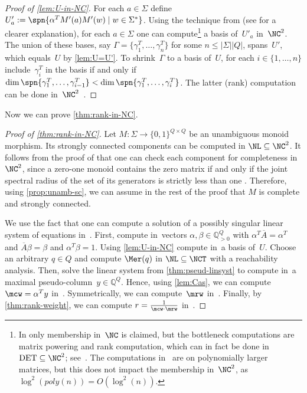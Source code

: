 \begin{proof}[Proof of \autoref{lem:U-in-NC}]
For each $a \in \Sigma$ define $U'_a := \spn{\alpha^T M'(a) M'(w) \mid w \in \Sigma^*}$.
Using the technique from \cite[Section 4.2]{KieferMW14} (see \cite[Proposition 5.2]{KieferWeighted20} for a clearer explanation), for each $a \in \Sigma$ one can compute\footnote{In \cite{KieferMW14,KieferWeighted20} only membership in~$\NC$ is claimed, but the bottleneck computations are matrix powering and rank computation, which can in fact be done in $\mathrm{DET} \subseteq \NC^2$; see~\cite{Cook85}.
The computations in~\cite[Proposition 5.2]{KieferWeighted20} are on polynomially larger matrices, but this does not impact the membership in~$\NC^2$, as $\log^2(\mathit{poly}(n)) = O(\log^2(n))$.} a basis of~$U'_a$ in~$\NC^2$.
The union of these bases, say $\Gamma = \{\gamma_1^T, \ldots, \gamma_n^T\}$ for some $n \le |\Sigma| |Q|$, spans~$U'$, which equals~$U$ by \autoref{lem:U=U'}.
To shrink~$\Gamma$ to a basis of~$U$, for each $i \in \{1, \ldots, n\}$ include~$\gamma_i^T$ in the basis if and only if $\dim \spn{\gamma_1^T, \ldots, \gamma_{i-1}^T} < \dim \spn{\gamma_1^T, \ldots, \gamma_i^T}$.
The latter (rank) computation can be done in~$\NC^2$~\cite{IbarraMoranRosier80}. %
\end{proof}

\noindent
Now we can prove \autoref{thm:rank-in-NC}.
\begin{proof}[Proof of \autoref{thm:rank-in-NC}]
Let $M : \Sigma \to \{0,1\}^{Q \times Q}$ be an unambiguous monoid morphism.
Its strongly connected components can be computed in $\NL \subseteq \NC^2$.
It follows from the proof of \cite[Proposition 3]{Kiefer2021} that one can check each component for completeness in~$\NC^2$, since a zero-one monoid contains the zero matrix if and only if the joint spectral radius of the set of its generators is strictly less than one \cite{Kiefer2021}.
Therefore, using \autoref{prop:unamb-sc}, we can assume in the rest of the proof that $M$ is complete and strongly connected.

We use the fact that one can compute a solution of a possibly singular linear system of equations in~\NCT \cite[Section~5]{BorodinGH82}.
First, compute in~\NCT vectors $\alpha, \beta \in \mathbb{Q}_{>0}^Q$ with $\alpha^T \overline{A} = \alpha^T$ and $\overline{A} \beta = \beta$ and $\alpha^T \beta = 1$.
Using \autoref{lem:U-in-NC} compute in~\NCT a basis of~$U$.
Choose an arbitrary $q \in Q$ and compute $\Mer(q)$ in $\NL \subseteq \NCT$ with a reachability analysis.
Then, solve the linear system from \autoref{thm:pseud-linsyst} to compute in~\NCT a maximal pseudo-column~$y \in \mathbb{Q}^Q$.
Hence, using \autoref{lem:Cas}, we can compute~$\mcw = \alpha^T y$ in~\NCT.
Symmetrically, we can compute~$\mrw$ in~\NCT.
Finally, by \autoref{thm:rank-weight}, we can compute $r = \frac{1}{\mcw \cdot \mrw}$ in~\NCT.
\end{proof}

